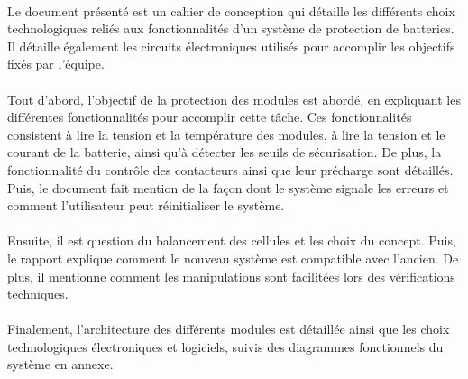 		\paragraph*{}
		Le document présenté est un cahier de conception qui détaille les différents choix technologiques reliés aux fonctionnalités d'un système de protection de batteries. Il détaille également les circuits électroniques utilisés pour accomplir les objectifs fixés par l'équipe.

		\paragraph*{}
		Tout d'abord, l'objectif de la protection des modules est abordé, en expliquant les différentes fonctionnalités pour accomplir cette tâche. Ces fonctionnalités consistent à lire la tension et la température des modules, à lire la tension et le courant de la batterie, ainsi qu'à détecter les seuils de sécurisation. De plus, la fonctionnalité du contrôle des contacteurs ainsi que leur précharge sont détaillés. Puis, le document fait mention de la façon dont le système signale les erreurs et comment l'utilisateur peut réinitialiser le système.

		\paragraph*{}
		Ensuite, il est question du balancement des cellules et les choix du concept. Puis, le rapport explique comment le nouveau système est compatible avec l'ancien. De plus, il mentionne comment les manipulations sont facilitées lors des vérifications techniques.

		\paragraph*{}
		Finalement, l'architecture des différents modules est détaillée ainsi que les choix technologiques électroniques et logiciels, suivis des diagrammes fonctionnels du système en annexe.


